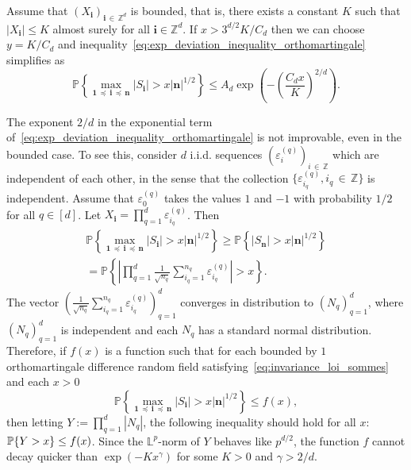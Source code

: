 \documentclass[AHL,Unicode,longabstracts,published]{cedram}
\newcommand\PP{\mathbb{P}}
\newcommand\Z{\mathbb{Z}}
\newcommand{\bbL}{\mathbb{L}}
\newcommand\ens[1]{\{ #1\}}
\newcommand\abs[1]{|#1|}
\newcommand{\pr}[1]{(#1)}
\newcommand\eps{\varepsilon}
\newcommand{\gr}[1]{\bm{#1}}
\newcommand{\gri}{\bm{i}}
\newcommand{\grn}{\bm{n}}
\newcommand{\imd}{\preccurlyeq}
\begin{document}
\begin{rema}
Assume that $\pr{X_{\gri}}_{\gri\,\in\,\Z^d}$ is bounded, that is, there exists a constant $K$ such that $\abs{X_{\gr{i}}}\leq K$ almost surely for all $\gri\in\Z^d$. If $x>3^{d/2}K/C_d$ then we can choose $y=K/C_d$ and inequality~\eqref{eq:exp_deviation_inequality_orthomartingale} simplifies as
\begin{equation}
\PP\left\{\max_{\gr{1}\,\imd\,\gri\,\imd\,\gr{n}} \left|S_{\gri} \right| >x\left|\grn\right|^{1/2}\right\}\leq A_d\exp\left(-\left(\frac{C_dx}{K}\right)^{2/d}\right).
\end{equation}
\end{rema}


\begin{rema}
The exponent $2/d$ in the exponential term of~\eqref{eq:exp_deviation_inequality_orthomartingale} is not improvable, even in the bounded case. To see this, consider $d$ i.i.d. sequences $\pr{\eps_i^{\pr{q}}}_{i\,\in\,\Z}$ which are independent of each other, in the sense that the collection $\ens{\eps_{i_q}^{\pr{q}}, i_q\,\in\,\Z}$ is independent. Assume that $\eps_0^{\pr{q}}$ takes the values $1$ and $-1$ with probability $1/2$ for all $q\in [d]$. Let $X_{\gri}=\prod_{q=1}^d\eps_{i_q}^{\pr{q}}$. Then
\begin{multline}
\PP\left\{\max_{\gr{1}\,\imd\,\gri\,\imd\,\gr{n} } \left|S_{\gri} \right| >x\left|\grn\right|^{1/2}\right\}\geq
\PP\left\{ \left|S_{\grn} \right| >x\left|\grn\right|^{1/2}\right\}\\
=
\PP\left\{ \left|\prod_{q=1}^d
\frac 1{\sqrt{n_q}}\sum_{i_q=1}^{n_q}\eps_{i_q}^{\pr{q}} \right| >x \right\}.
\end{multline}
The vector $\pr{\frac 1{\sqrt{n_q}}\sum_{i_q=1}^{n_q}\eps_{i_q}^{\pr{q}}}_{q=1}^d$ converges in distribution to $\pr{N_q}_{q=1}^d$, where $\pr{N_q}_{q=1}^d$ is independent and each $N_q$ has a standard normal distribution. Therefore, if $f\pr{x}$ is a function such that for each bounded by $1$ orthomartingale difference random field satisfying~\eqref{eq:invariance_loi_sommes} and each $x>0$
\begin{equation}
\PP\left\{\max_{\gr{1}\,\imd\,\gri\,\imd\,\gr{n}} \left|S_{\gri} \right| >x\left|\grn\right|^{1/2}\right\}\leq f\pr{x},
\end{equation}
then letting $Y:= \prod_{q=1}^d\abs{N_q}$, the following inequality should hold for all $x$: $\PP\ens{Y>x}\linebreak\leq f\pr{x}$. Since the $\bbL^p$-norm of $Y$ behaves like $p^{d/2}$, the function $f$ cannot decay quicker than $\exp\pr{-Kx^{\gamma}}$ for some $K>0$ and $\gamma>2/d$.
\end{rema}
\end{document}
